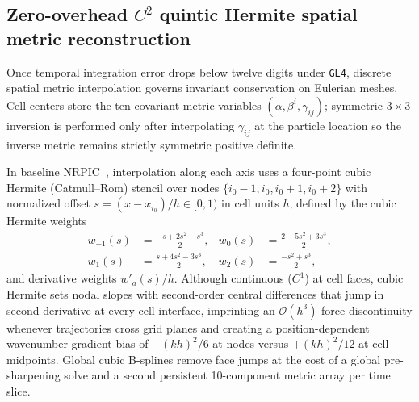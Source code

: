 \subsection{Zero-overhead \texorpdfstring{$C^2$}{C2} quintic Hermite spatial metric reconstruction}\label{sec:method_quintic}

Once temporal integration error drops below twelve digits under \texttt{GL4}, discrete spatial metric interpolation governs invariant conservation on Eulerian meshes. Cell centers store the ten covariant metric variables $(\alpha, \beta^i, \gamma_{ij})$; symmetric $3\times 3$ inversion is performed only after interpolating $\gamma_{ij}$ at the particle location so the inverse metric remains strictly symmetric positive definite.

In baseline NRPIC~\cite{Wu:2026nrpic}, interpolation along each axis uses a four-point cubic Hermite (Catmull--Rom) stencil over nodes $\{i_0-1, i_0, i_0+1, i_0+2\}$ with normalized offset $s = (x - x_{i_0})/h \in [0, 1)$ in cell units $h$, defined by the cubic Hermite weights
\begin{align}\label{eq:hermite_weights}
w_{-1}(s) &= \frac{-s + 2s^2 - s^3}{2}, &
w_{0}(s) &= \frac{2 - 5s^2 + 3s^3}{2}, \nonumber\\
w_{1}(s) &= \frac{s + 4s^2 - 3s^3}{2}, &
w_{2}(s) &= \frac{-s^2 + s^3}{2},
\end{align}
and derivative weights $w'_a(s)/h$. Although continuous ($C^1$) at cell faces, cubic Hermite sets nodal slopes with second-order central differences that jump in second derivative at every cell interface, imprinting an $\mathcal{O}(h^3)$ force discontinuity whenever trajectories cross grid planes and creating a position-dependent wavenumber gradient bias of $-(kh)^2/6$ at nodes versus $+(kh)^2/12$ at cell midpoints. Global cubic B-splines remove face jumps at the cost of a global pre-sharpening solve and a second persistent 10-component metric array per time slice.


